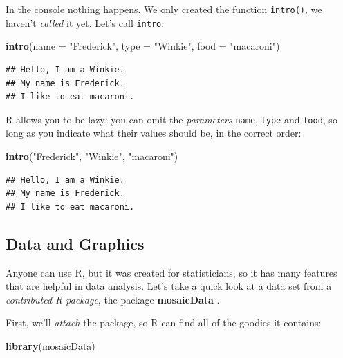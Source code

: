 \documentclass[]{book}
\makeatletter
\newenvironment{Shaded}{\begin{snugshade}}{\end{snugshade}}
\newcommand{\KeywordTok}[1]{\textcolor[rgb]{0.13,0.29,0.53}{\textbf{#1}}}
\newcommand{\DataTypeTok}[1]{\textcolor[rgb]{0.13,0.29,0.53}{#1}}
\newcommand{\StringTok}[1]{\textcolor[rgb]{0.31,0.60,0.02}{#1}}
\newcommand{\NormalTok}[1]{#1}
\newenvironment{kframe}{%
\medskip{}
\setlength{\fboxsep}{.8em}
 \def\at@end@of@kframe{}%
 \ifinner\ifhmode%
  \def\at@end@of@kframe{\end{minipage}}%
  \begin{minipage}{\columnwidth}%
 \fi\fi%
 \def\FrameCommand##1{\hskip\@totalleftmargin \hskip-\fboxsep
 \colorbox{shadecolor}{##1}\hskip-\fboxsep
     \hskip-\linewidth \hskip-\@totalleftmargin \hskip\columnwidth}%
 \MakeFramed {\advance\hsize-\width
   \@totalleftmargin\z@ \linewidth\hsize
   \@setminipage}}%
 {\par\unskip\endMakeFramed%
 \at@end@of@kframe}
\renewenvironment{Shaded}{\begin{kframe}}{\end{kframe}}
\theoremstyle{definition}
\theoremstyle{definition}
\theoremstyle{definition}
\theoremstyle{remark}
\makeatother
\begin{document}
In the console nothing happens. We only created the function
\texttt{intro()}, we haven't \emph{called} it yet. Let's call
\texttt{intro}:

\begin{Shaded}
\begin{Highlighting}[]
\KeywordTok{intro}\NormalTok{(}\DataTypeTok{name =} \StringTok{"Frederick"}\NormalTok{, }\DataTypeTok{type =} \StringTok{"Winkie"}\NormalTok{, }\DataTypeTok{food =} \StringTok{"macaroni"}\NormalTok{)}
\end{Highlighting}
\end{Shaded}

\begin{verbatim}
## Hello, I am a Winkie.  
## My name is Frederick.
## I like to eat macaroni.
\end{verbatim}

R allows you to be lazy: you can omit the \emph{parameters}
\texttt{name}, \texttt{type} and \texttt{food}, so long as you indicate
what their values should be, in the correct order:

\begin{Shaded}
\begin{Highlighting}[]
\KeywordTok{intro}\NormalTok{(}\StringTok{"Frederick"}\NormalTok{, }\StringTok{"Winkie"}\NormalTok{, }\StringTok{"macaroni"}\NormalTok{)}
\end{Highlighting}
\end{Shaded}

\begin{verbatim}
## Hello, I am a Winkie.  
## My name is Frederick.
## I like to eat macaroni.
\end{verbatim}

\subsection{Data and Graphics}\label{idea-data}

Anyone can use R, but it was created for statisticians, so it has many
features that are helpful in data analysis. Let's take a quick look at a
data set from a \emph{contributed R package}, the package
\textbf{mosaicData} \citep{R-mosaicData}.

First, we'll \emph{attach} the package,
 so R can find all of
the goodies it contains:

\begin{Shaded}
\begin{Highlighting}[]
\KeywordTok{library}\NormalTok{(mosaicData)}
\end{Highlighting}
\end{Shaded}
\end{document}
